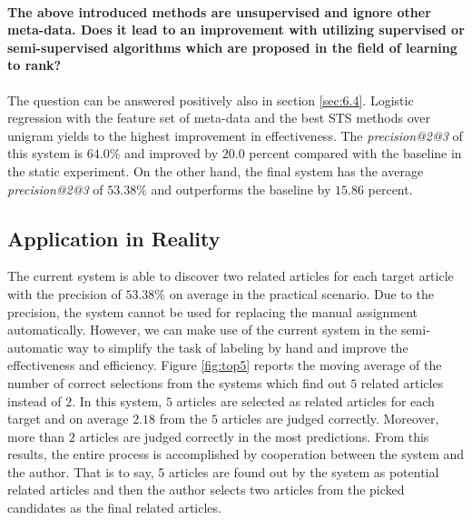 \paragraph{The above introduced methods are unsupervised and ignore other meta-data. Does it lead to an improvement with utilizing supervised or semi-supervised algorithms which are proposed in the field of learning to rank?}

The question can be answered positively also in section \ref{sec:6.4}. Logistic regression with the feature set of meta-data and the best STS methods over unigram yields to the highest improvement in effectiveness. The \textit{precision@2@3} of this system is $64.0\%$ and improved by $20.0$ percent compared with the baseline in the static experiment. On the other hand, the final system has the average \textit{precision@2@3} of $53.38\%$ and outperforms the baseline by $15.86$ percent. 

\subsection{Application in Reality}

The current system is able to discover two related articles for each target article with the precision of $53.38\%$ on average in the practical scenario. Due to the precision, the system cannot be used for replacing the manual assignment automatically. However, we can make use of the current system in the semi-automatic way to simplify the task of labeling by hand and improve the effectiveness and efficiency. Figure \ref{fig:top5} reports the moving average of the number of correct selections from the systems which find out $5$ related articles instead of $2$. In this system, $5$ articles are selected as related articles for each target and on average $2.18$ from the $5$ articles are judged correctly. Moreover, more than $2$ articles are judged correctly in the most predictions. From this results, the entire process is accomplished by cooperation between the system and the author. That is to say, 5 articles are found out by the system as potential related articles and then the author selects two articles from the picked candidates as the final related articles. 

\clearpage

